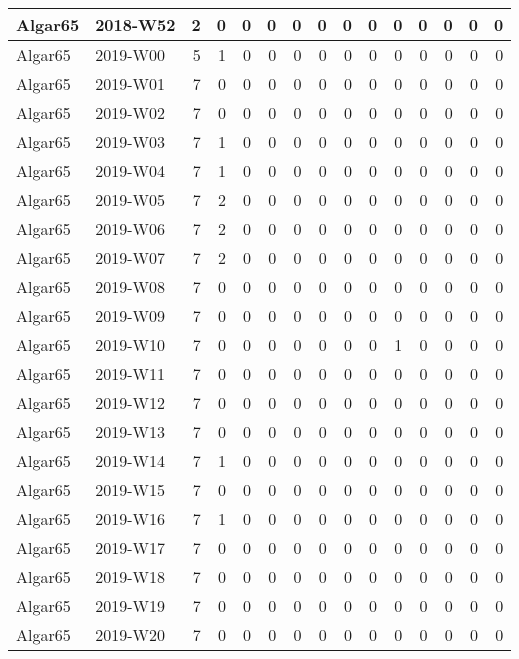 \documentclass[]{book}
\begin{document}
\begin{table}
\begin{tabular}[t]{l|l|r|r|r|r|r|r|r|r|r|r|r|r|r}
\hline
Algar65 & 2018-W52 & 2 & 0 & 0 & 0 & 0 & 0 & 0 & 0 & 0 & 0 & 0 & 0 & 0\\
\hline
Algar65 & 2019-W00 & 5 & 1 & 0 & 0 & 0 & 0 & 0 & 0 & 0 & 0 & 0 & 0 & 0\\
\hline
Algar65 & 2019-W01 & 7 & 0 & 0 & 0 & 0 & 0 & 0 & 0 & 0 & 0 & 0 & 0 & 0\\
\hline
Algar65 & 2019-W02 & 7 & 0 & 0 & 0 & 0 & 0 & 0 & 0 & 0 & 0 & 0 & 0 & 0\\
\hline
Algar65 & 2019-W03 & 7 & 1 & 0 & 0 & 0 & 0 & 0 & 0 & 0 & 0 & 0 & 0 & 0\\
\hline
Algar65 & 2019-W04 & 7 & 1 & 0 & 0 & 0 & 0 & 0 & 0 & 0 & 0 & 0 & 0 & 0\\
\hline
Algar65 & 2019-W05 & 7 & 2 & 0 & 0 & 0 & 0 & 0 & 0 & 0 & 0 & 0 & 0 & 0\\
\hline
Algar65 & 2019-W06 & 7 & 2 & 0 & 0 & 0 & 0 & 0 & 0 & 0 & 0 & 0 & 0 & 0\\
\hline
Algar65 & 2019-W07 & 7 & 2 & 0 & 0 & 0 & 0 & 0 & 0 & 0 & 0 & 0 & 0 & 0\\
\hline
Algar65 & 2019-W08 & 7 & 0 & 0 & 0 & 0 & 0 & 0 & 0 & 0 & 0 & 0 & 0 & 0\\
\hline
Algar65 & 2019-W09 & 7 & 0 & 0 & 0 & 0 & 0 & 0 & 0 & 0 & 0 & 0 & 0 & 0\\
\hline
Algar65 & 2019-W10 & 7 & 0 & 0 & 0 & 0 & 0 & 0 & 0 & 1 & 0 & 0 & 0 & 0\\
\hline
Algar65 & 2019-W11 & 7 & 0 & 0 & 0 & 0 & 0 & 0 & 0 & 0 & 0 & 0 & 0 & 0\\
\hline
Algar65 & 2019-W12 & 7 & 0 & 0 & 0 & 0 & 0 & 0 & 0 & 0 & 0 & 0 & 0 & 0\\
\hline
Algar65 & 2019-W13 & 7 & 0 & 0 & 0 & 0 & 0 & 0 & 0 & 0 & 0 & 0 & 0 & 0\\
\hline
Algar65 & 2019-W14 & 7 & 1 & 0 & 0 & 0 & 0 & 0 & 0 & 0 & 0 & 0 & 0 & 0\\
\hline
Algar65 & 2019-W15 & 7 & 0 & 0 & 0 & 0 & 0 & 0 & 0 & 0 & 0 & 0 & 0 & 0\\
\hline
Algar65 & 2019-W16 & 7 & 1 & 0 & 0 & 0 & 0 & 0 & 0 & 0 & 0 & 0 & 0 & 0\\
\hline
Algar65 & 2019-W17 & 7 & 0 & 0 & 0 & 0 & 0 & 0 & 0 & 0 & 0 & 0 & 0 & 0\\
\hline
Algar65 & 2019-W18 & 7 & 0 & 0 & 0 & 0 & 0 & 0 & 0 & 0 & 0 & 0 & 0 & 0\\
\hline
Algar65 & 2019-W19 & 7 & 0 & 0 & 0 & 0 & 0 & 0 & 0 & 0 & 0 & 0 & 0 & 0\\
\hline
Algar65 & 2019-W20 & 7 & 0 & 0 & 0 & 0 & 0 & 0 & 0 & 0 & 0 & 0 & 0 & 0\\

\end{tabular}
\end{table}
\end{document}
